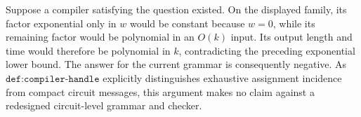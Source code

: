 Suppose a compiler satisfying the question existed.  On the displayed family, its factor exponential only in \(w\) would be constant because \(w=0\), while its remaining factor would be polynomial in an \(O(k)\) input.  Its output length and time would therefore be polynomial in \(k\), contradicting the preceding exponential lower bound.  The answer for the current grammar is consequently negative.  As \(\texttt{def:compiler-handle}\) explicitly distinguishes exhaustive assignment incidence from compact circuit messages, this argument makes no claim against a redesigned circuit-level grammar and checker.
